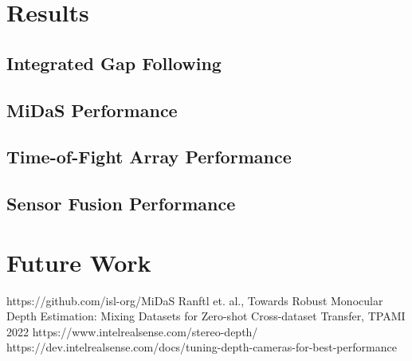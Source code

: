 \documentclass[conference]{IEEEtran}
\begin{document}
\section{Results}
\subsection{Integrated Gap Following}
\subsection{MiDaS Performance}
\subsection{Time-of-Fight Array Performance}
\subsection{Sensor Fusion Performance}

\section{Future Work}



\begin{thebibliography}{00}
 https://github.com/isl-org/MiDaS
 Ranftl et. al., Towards Robust Monocular Depth Estimation:
Mixing Datasets for Zero-shot Cross-dataset Transfer, TPAMI 2022
 https://www.intelrealsense.com/stereo-depth/
 https://dev.intelrealsense.com/docs/tuning-depth-cameras-for-best-performance
\end{thebibliography}
\end{document}
